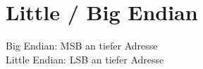 \section{Little / Big Endian}
Big Endian: MSB an tiefer Adresse \\
Little Endian: LSB an tiefer Adresse

